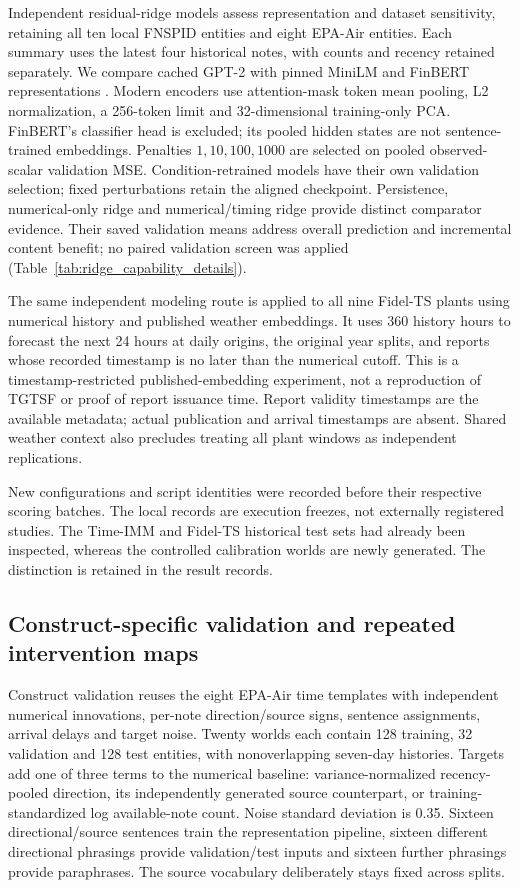 Independent residual-ridge models assess representation and dataset sensitivity, retaining all ten local FNSPID entities and eight EPA-Air entities. Each summary uses the latest four historical notes, with counts and recency retained separately. We compare cached GPT-2 with pinned MiniLM and FinBERT representations \cite{reimers2019sentencebert,minilmmodel,finbertmodel}. Modern encoders use attention-mask token mean pooling, L2 normalization, a 256-token limit and 32-dimensional training-only PCA. FinBERT's classifier head is excluded; its pooled hidden states are not sentence-trained embeddings. Penalties $1,10,100,1000$ are selected on pooled observed-scalar validation MSE. Condition-retrained models have their own validation selection; fixed perturbations retain the aligned checkpoint. Persistence, numerical-only ridge and numerical/timing ridge provide distinct comparator evidence. Their saved validation means address overall prediction and incremental content benefit; no paired validation screen was applied (Table~\ref{tab:ridge_capability_details}).

The same independent modeling route is applied to all nine Fidel-TS plants using numerical history and published weather embeddings. It uses 360 history hours to forecast the next 24 hours at daily origins, the original year splits, and reports whose recorded timestamp is no later than the numerical cutoff. This is a timestamp-restricted published-embedding experiment, not a reproduction of TGTSF or proof of report issuance time. Report validity timestamps are the available metadata; actual publication and arrival timestamps are absent. Shared weather context also precludes treating all plant windows as independent replications.

New configurations and script identities were recorded before their respective scoring batches. The local records are execution freezes, not externally registered studies. The Time-IMM and Fidel-TS historical test sets had already been inspected, whereas the controlled calibration worlds are newly generated. The distinction is retained in the result records.

\subsection{Construct-specific validation and repeated intervention maps}

Construct validation reuses the eight EPA-Air time templates with independent numerical innovations, per-note direction/source signs, sentence assignments, arrival delays and target noise. Twenty worlds each contain 128 training, 32 validation and 128 test entities, with nonoverlapping seven-day histories. Targets add one of three terms to the numerical baseline: variance-normalized recency-pooled direction, its independently generated source counterpart, or training-standardized log available-note count. Noise standard deviation is 0.35. Sixteen directional/source sentences train the representation pipeline, sixteen different directional phrasings provide validation/test inputs and sixteen further phrasings provide paraphrases. The source vocabulary deliberately stays fixed across splits.

